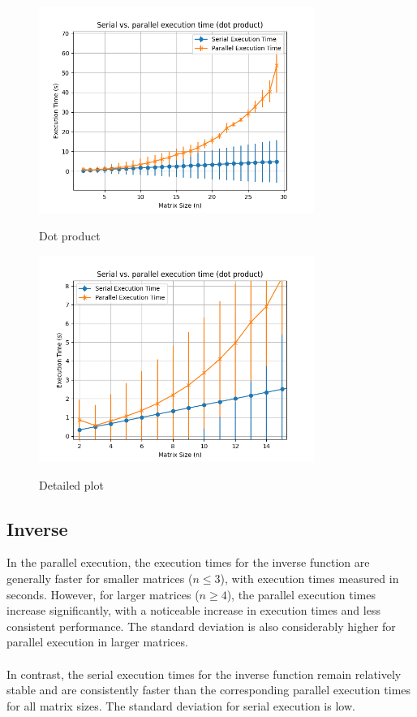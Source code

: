 \begin{figure}[H]
    \includegraphics[width=0.8\textwidth, keepaspectratio]{img/dot_2_30_5.png}
    \centering
    \label{fig:dot}
    \caption{Dot product}

    \includegraphics[width=0.8\textwidth, keepaspectratio]{img/dot_2_30_5_detail.png}
    \centering
    \label{fig:dot_detail}
    \caption{Detailed plot}
\end{figure}  

\subsection{Inverse}
In the parallel execution, the execution times for the inverse function are generally faster for smaller matrices ($n \le 3$), with execution times measured in seconds. However, for larger matrices ($n \ge 4$), the parallel execution times increase significantly, with a noticeable increase in execution times and less consistent performance. The standard deviation is also considerably higher for parallel execution in larger matrices.
\\\\
In contrast, the serial execution times for the inverse function remain relatively stable and are consistently faster than the corresponding parallel execution times for all matrix sizes. The standard deviation for serial execution is low.


